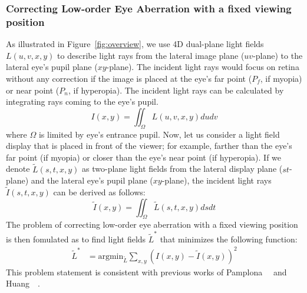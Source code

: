 \subsubsection{Correcting Low-order Eye Aberration with a fixed viewing position}
As illustrated in Figure~\ref{fig:overview}, we use 4D dual-plane light fields $L(u,v,x,y)$ to describe light rays from the lateral image plane ($uv$-plane) to the lateral eye's pupil plane ($xy$-plane). The incident light rays would focus on retina without any correction if the image is placed at the eye's far point ($P_f$, if myopia) or near point ($P_n$, if hyperopia). The incident light rays can be calculated by integrating rays coming to the eye's pupil.
\begin{equation}
	I(x,y) = \iint_{\Omega} L(u,v,x,y) dudv
\end{equation}
where $\Omega$ is limited by eye's entrance pupil. Now, let us consider a light field display that is placed in front of the viewer; for example, farther than the eye's far point (if myopia) or closer than the eye's near point (if hyperopia). If we denote $\tilde{L}(s,t,x,y)$ as two-plane light fields from the lateral display plane ($st$-plane) and the lateral eye's pupil plane ($xy$-plane), the incident light rays $\tilde{I}(s,t,x,y)$ can be derived as follows:
\begin{equation}
	\tilde{I}(x,y) = \iint_{\Omega} \tilde{L}(s,t,x,y)  dsdt
\end{equation}
The problem of correcting low-order eye aberration with a fixed viewing position is then fomulated as to find light fields $\tilde{L}^{*}$ that minimizes the following function:
\begin{align}
	\tilde{L}^{*} &= \text{argmin}_{\tilde{L}} \sum_{x,y} (I(x,y)-\tilde{I}(x,y))^{2}
\end{align}
This problem statement is consistent with previous works of Pamplona~\etal~\cite{pamplona12} and Huang~\etal~\cite{huang14}. 



